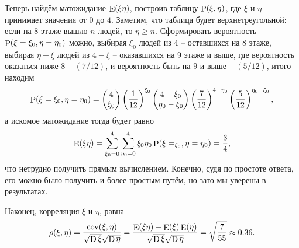 Теперь найдём матожидание $\E(\xi \eta)$, построив таблицу $\P(\xi, \eta)$, где $\xi$ и $\eta$ принимает значения от $0$ до $4$. Заметим, что таблица будет верхнетреугольной: если на $8$ этаже вышло $n$ людей, то $\eta \geq n$. Сформировать вероятность $\P(\xi = \xi_0, \eta = \eta_0)$ можно, выбирая $\xi_0$ людей из $4$ -- оставшихся на $8$ этаже, выбирая $\eta-\xi$ людей из $4-\xi$ -- оказавшихся на 9 этаже и выше, где вероятность оказаться ниже 8 -- $(7/12)$,  и вероятность быть на $9$ и выше -- $(5/12)$, итого находим
\begin{equation*}
    \P(\xi = \xi_0, \eta = \eta_0) = \begin{pmatrix}
        4 \\ \xi_0
    \end{pmatrix}
    \left(
        \frac{1}{12}
    \right)^{\xi_0} 
    \begin{pmatrix}
        4 - \xi_0 \\ \eta_0 - \xi_0
    \end{pmatrix}
    \left(
        \frac{7}{12}
    \right)^{4-\eta_0}
    \left(
        \frac{5}{12}
    \right)^{\eta_0-\xi_0},
\end{equation*}
а искомое матожидание тогда будет равно
\begin{equation*}
    \E (\xi \eta) =  \sum_{\xi_0 = 0}^{4} \sum_{\eta_0 = 0}^{4}
    \xi_0 \eta_0 \P(\xi=_{\xi_0}, \eta={\eta_0}) = \frac{3}{4},
\end{equation*}
что нетрудно получить прямым вычислением. Конечно, судя по простоте ответа, его можно было получить и более простым путём, но зато мы уверены в результатах. 

Наконец, корреляция $\xi$ и $\eta$, равна
\begin{equation*}
    \rho(\xi, \eta) = \frac{\cov(\xi, \eta)}{\sqrt{\D \xi} \sqrt{\D \eta}} = 
    \frac{\E(\xi \eta) - \E(\xi) \E(\eta)}{\sqrt{\D \xi} \sqrt{\D \eta}} = \sqrt{\frac{7}{55}} \approx 0.36.
\end{equation*}



